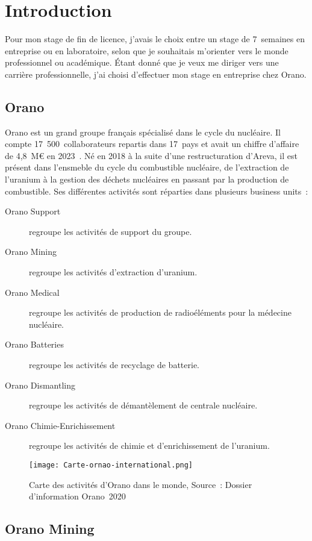 \section{Introduction}

Pour mon stage de fin de licence, j'avais le choix entre un stage de 7~semaines en entreprise ou en laboratoire, selon que je souhaitais m'orienter vers le monde professionnel ou académique. Étant donné que je veux me diriger vers une carrière professionnelle, j'ai choisi d'effectuer mon stage en entreprise chez Orano.
\subsection{Orano}
Orano est un grand groupe français spécialisé dans le cycle du nucléaire. Il compte 17~500~collaborateurs repartis dans 17~pays et avait un chiffre d'affaire de 4,8~M€ en 2023~\cite{report:rapport_activiter}. Né en 2018 à la suite d'une restructuration d'Areva, il est présent dans l'ensmeble du cycle du combustible nucléaire, de l'extraction de l'uranium à la gestion des déchets nucléaires en passant par la production de combustible. Ses différentes activités sont réparties dans plusieurs business units~:
\begin{description}
    \item [Orano Support]  regroupe les activités de support du groupe.
    \item [Orano Mining] regroupe les activités d'extraction d'uranium.
    \item [Orano Medical] regroupe les activités de production de radioéléments pour la médecine nucléaire.
    \item [Orano Batteries] regroupe les activités de recyclage de batterie.
    \item [Orano Dismantling] regroupe les activités de démantèlement de centrale nucléaire.
    \item [Orano Chimie-Enrichissement] regroupe les activités de chimie et d'enrichissement de l'uranium.
\end{description}
\begin{figure}[hb]
    \centering
    \texttt{[image: Carte-ornao-international.png]}
    \caption[Carte des activités d’Orano dans le monde]{Carte des activités d’Orano dans le monde, Source~: Dossier d’information Orano~2020}
    \label{fig_carte_orano}
\end{figure}




\subsection{Orano Mining}

